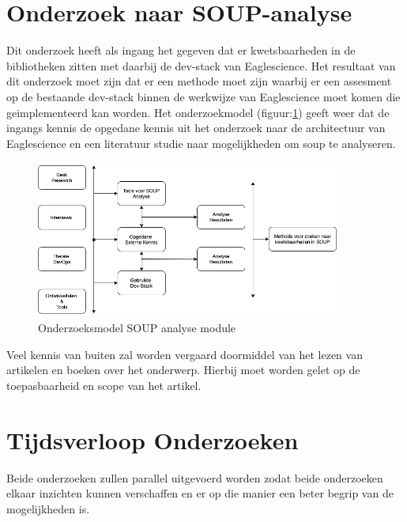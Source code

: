 \section{Onderzoek naar SOUP-analyse}\label{sec:onderzoek-naar-soup-analyse}
Dit onderzoek heeft als ingang het gegeven dat er kwetsbaarheden in de bibliotheken zitten met daarbij de dev-stack van Eaglescience.
Het resultaat van dit onderzoek moet zijn dat er een methode moet zijn waarbij er een assesment op de bestaande dev-stack binnen de werkwijze van Eaglescience moet komen die geimplementeerd kan worden.
Het onderzoekmodel (figuur:\ref{fig:Onderzoeks model Dev-Stack}) geeft weer dat de ingangs kennis de opgedane kennis uit het onderzoek naar de architectuur van Eaglescience en een literatuur studie naar mogelijkheden om soup te analyseren.

\begin{figure}[h!] %
  \myfloatalign
  \includegraphics[width=10cm]{gfx/OnderzoeksmodelSOUP}
  \caption{Onderzoeksmodel SOUP analyse module}
  \label{fig:Onderzoeks model Dev-Stack}
\end{figure}

Veel kennis van buiten zal worden vergaard doormiddel van het lezen van artikelen en boeken over het onderwerp.
Hierbij moet worden gelet op de toepasbaarheid en scope van het artikel.

\section{Tijdsverloop Onderzoeken}\label{sec:tijdsverloop-onderzoeken}
Beide onderzoeken zullen parallel uitgevoerd worden zodat beide onderzoeken elkaar inzichten kunnen verschaffen en er op die manier een beter begrip van de mogelijkheden is.
